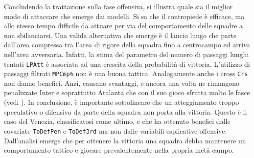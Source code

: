 Concludendo la trattazione sulla fase offensiva, si illustra quale sia il miglior modo di attaccare che emerge dai modelli. Si sa che il contropiede è efficace, ma allo stesso tempo difficile da attuare per via del comportamento delle squadre a non sbilanciarsi. Una valida alternativa che emerge è il lancio lungo che parte dall'area compressa tra l'area di rigore della squadra fino a centrocampo ed arriva nell'area avversaria. Infatti, la stima del parametro del numero di passaggi lunghi tentati \texttt{LPAtt} è associata ad una crescita della probabilità di vittoria. L'utilizzo di passaggi filtrati \texttt{MPCmp\%} non è una buona tattica. Analogamente anche i cross \texttt{Crs} non danno benefici. Anzi, causano svantaggi, e ancora una volta ne rimangono penalizzate Inter e soprattutto Atalanta che con il suo gioco sfrutta molto le fasce (vedi \textit{\cite{ataGioco}}). In conclusione, è importante sottolineare che un atteggiamento troppo speculativo o difensivo da parte della squadra non porta alla vittoria. Questo è il caso del Venezia, classificatosi come ultimo, e che ha ottenuto benefici dalle covariate \texttt{ToDefPen} e \texttt{ToDef3rd} ma non dalle variabili esplicative offensive. Dall'analisi emerge che per ottenere la vittoria una squadra debba mantenere un comportamento tattico e giocare prevalentemente nella propria metà campo.

